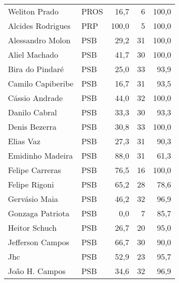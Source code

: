 \begin{longtable}{llrrr}
                       Weliton Prado &           PROS &      16,7 &            6 &      100,0 \\
                   Alcides Rodrigues &            PRP &     100,0 &            5 &      100,0 \\
                    Alessandro Molon &            PSB &      29,2 &           31 &      100,0 \\
                       Aliel Machado &            PSB &      41,7 &           30 &      100,0 \\
                     Bira do Pindaré &            PSB &      25,0 &           33 &       93,9 \\
                   Camilo Capiberibe &            PSB &      16,7 &           31 &       93,5 \\
                      Cássio Andrade &            PSB &      44,0 &           32 &      100,0 \\
                       Danilo Cabral &            PSB &      33,3 &           30 &       93,3 \\
                       Denis Bezerra &            PSB &      30,8 &           33 &      100,0 \\
                           Elias Vaz &            PSB &      27,3 &           31 &       90,3 \\
                    Emidinho Madeira &            PSB &      88,0 &           31 &       61,3 \\
                     Felipe Carreras &            PSB &      76,5 &           16 &      100,0 \\
                       Felipe Rigoni &            PSB &      65,2 &           28 &       78,6 \\
                       Gervásio Maia &            PSB &      46,2 &           32 &       96,9 \\
                    Gonzaga Patriota &            PSB &       0,0 &            7 &       85,7 \\
                       Heitor Schuch &            PSB &      26,7 &           20 &       95,0 \\
                    Jefferson Campos &            PSB &      66,7 &           30 &       90,0 \\
                                 Jhc &            PSB &      52,9 &           23 &       95,7 \\
                      João H. Campos &            PSB &      34,6 &           32 &       96,9 \\

\end{longtable}
